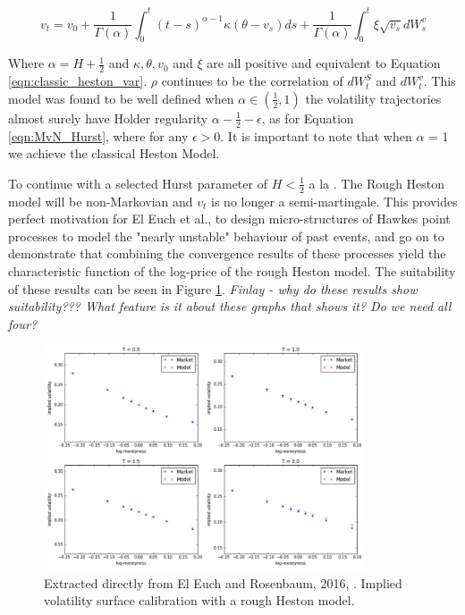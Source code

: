 \documentclass[12pt,oneside]{article}
\begin{document}
\begin{equation}
\label{eqn:rough_heston}
v_t = v_0 + \frac{1}{\Gamma(\alpha)} \int_{0}^{t} (t-s)^{\alpha-1} \kappa (\theta - v_s)ds + \frac{1}{\Gamma(\alpha)} \int_{0}^{t} \xi\sqrt{v_s}dW_s^{v}
\end{equation}

Where $\alpha = H+\frac{1}{2}$ and $\kappa, \theta, v_0$ and $\xi$ are all positive and equivalent to Equation \ref{eqn:classic_heston_var}. $\rho$ continues to be the correlation of $dW^S_t$ and $dW^v_t$. This model was found to be well defined when ${\alpha} \in (\frac{1}{2},1)$ the volatility trajectories almost surely have Holder regularity $\alpha - \frac{1}{2} -\epsilon$, as for Equation \ref{eqn:MvN_Hurst}, where for any $\epsilon>0$. It is important to note that when $\alpha$ = 1 we achieve the classical Heston Model. 

To continue with a selected Hurst parameter of $H < \frac{1}{2}$ a la \cite{gatheral2014volatility}. The Rough Heston model will be non-Markovian and $v_t$ is no longer a semi-martingale. This provides perfect motivation for El Euch et al., to design micro-structures of Hawkes point processes to model the "nearly unstable" behaviour of past events, and go on to demonstrate that combining the convergence results of these processes yield the characteristic function of the log-price of the rough Heston model. The suitability of these results can be seen in Figure \ref{fig:elEuch_1}. \emph{Finlay - why do these results show suitability??? What feature is it about these graphs that shows it? Do we need all four?}

\begin{figure}[htpb]
    \centering
    \includegraphics[width=0.85\textwidth ]{figs/elEuch_1.jpg}
    \caption{Extracted directly from El Euch and Rosenbaum, 2016, \cite[Figure~5.1]{omar2016microstructural}. Implied volatility surface calibration with a rough Heston model.}
    \label{fig:elEuch_1}
\end{figure}
\end{document}
